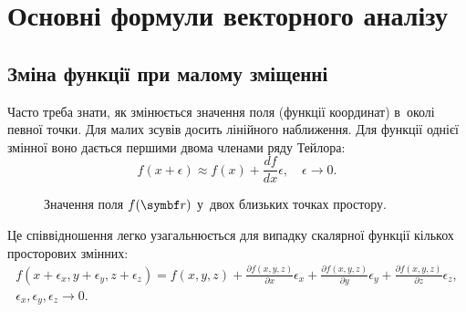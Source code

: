 

\clearpage

\section{Основні формули векторного аналізу}\label{Vanaliz}\hypertarget{Vanaliz}{}

\subsection{Зміна функції при малому зміщенні}\label{sec:SmallShift}\hypertarget{vector-small-shift}{}



Часто треба знати, як змінюється значення поля (функції координат) в~околі певної точки. Для малих зсувів
досить лінійного наближення. Для функції однієї змінної воно дається першими двома
членами ряду Тейлора:
\begin{equation*}
	f(x + \epsilon) \approx f(x) + \frac{df}{dx}\epsilon, \quad \epsilon \to 0.
\end{equation*}

\begin{figure}
	\centering

	

	\caption{Значення поля $f(\vect{r})$ у~двох близьких точках простору.}
\end{figure}

Це співвідношення легко узагальнюється для випадку скалярної функції кількох просторових
змінних:
\begin{multline*}
	f(x + \epsilon_x, y + \epsilon_y, z + \epsilon_z) =
	f(x, y, z) +
	\frac{\partial f(x, y, z)}{\partial x} \epsilon_x +
	\frac{\partial f(x, y, z)}{\partial y} \epsilon_y +
	\frac{\partial f(x, y, z)}{\partial z} \epsilon_z, \\ \epsilon_x, \epsilon_y,
	\epsilon_z  \to 0.
\end{multline*}

